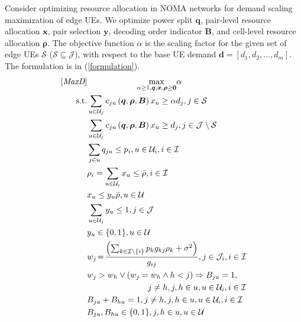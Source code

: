 \documentclass[10pt,journal,final,finalsubmission,twocolumn]{IEEEtran}
\begin{document}
Consider optimizing resource allocation in NOMA networks for demand scaling maximization of edge UEs. We optimize power split $\boldsymbol{q}$, pair-level resource allocation $\boldsymbol{x}$, pair selection $\boldsymbol{y}$, decoding order indicator $\boldsymbol{B}$, and cell-level resource allocation $\boldsymbol{\rho}$. The objective function $\alpha$ is the scaling factor for the given set of edge UEs $\mathcal{S}$ ($\mathcal{S}\subseteq \mathcal{J}$), with respect to the base UE demand $\boldsymbol{d}=[d_1,d_2,...,d_m]$. The formulation is in (\ref {formulation}).
\begin{subequations}\label{formulation}
\begin{align}
\textup{[{\em MaxD}]}&\ \ \ \ \ \ \ \ \ \ \ \ \ \ \ \ \ \ \underset{\alpha \geq 1,\boldsymbol{q},\boldsymbol{x},\boldsymbol{\rho}\geq \boldsymbol{0} }{\max} \alpha  \\
\textup{ s.t.}& \sum\limits_{u\in {\mathcal{U}}_j} c_{ju}\left (\boldsymbol{q},\boldsymbol{ \rho}, \boldsymbol{B}\right )x_u\geq \alpha d_j, j\in \mathcal{S}\label{demand1}\\ 
& \sum\limits_{u\in {\mathcal{U}}_j} c_{ju}\left (\boldsymbol{q},\boldsymbol{ \rho}, \boldsymbol{B}\right )x_u\geq  d_j, j\in \mathcal{J} \setminus  \mathcal{S}\label{demand2}\\ 
&\sum \limits_{j \in u} q_{ju}\leq p_i,u\in {\mathcal{U}}_i, i\in \mathcal{I}  \label{limit1}\\
&\rho _i =\sum \limits_{u\in {\mathcal{U}}_i}x_u\leq \bar{\rho}, i\in \mathcal{I} \label{limit2}\\
&x_u\leq y_u \bar{\rho}, u\in \mathcal{U}\label{y1}\\
&\sum\limits_{u\in \mathcal{U}_j}y_u\leq1,j\in\mathcal{J}\label{y2}\\
&y_u\in\{0,1\}, u\in \mathcal{U}\label{y3}\\
&w_j\!=\!  \frac{\left(\sum \nolimits_{k \in \mathcal{I}\setminus \left \{ i \right \} }p_k g_{kj}\rho_k+\sigma ^2   \right)}{ g_{ij}},j \in \mathcal{J}_i ,i\in \mathcal{I}\label{order0}\\
&w_j>w_h\vee(w_j=w_h\wedge h < j)\Rightarrow B_{ju}=1,\notag\\
&\ \ \ \ \ \ \ \ \ \ \ \ \ \ \ \ \ \ \ \ \ \ j\neq h,j,h\in u, u\in \mathcal{U}_i, i\in \mathcal{I}\label{order1}\\
&B_{ju}+B_{hu}=1, j\neq h, j,h\in u, u\in \mathcal{U}_i, i\in \mathcal{I}\label{order2}\\
&B_{ju},B_{hu}\in\{0,1\}, j,h \in u, u\in \mathcal{U}\label{order3}
\end{align}
\end{subequations}
\end{document}
